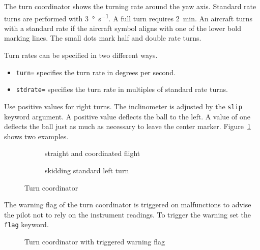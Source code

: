 The turn coordinator shows the turning rate around the yaw axis. Standard rate
turns are performed with \SI{3}{\degree\per\second}. A full turn requires
\SI{2}{\minute}. An aircraft turns with a standard rate if the aircraft symbol
aligns with one of the lower bold marking lines. The small dots mark half and
double rate turns.

Turn rates can be specified in two different ways.

\begin{itemize}
\item \texttt{turn=} specifies the turn rate in degrees per second.
\item \texttt{stdrate=} specifies the turn rate in multiples of standard rate turns.
\end{itemize}

Use positive values for right turns. The inclinometer is adjusted by the
\texttt{slip} keyword argument. A positive value deflects the ball to the left.
A value of one deflects the ball just as much as necessary to leave the center
marker. Figure~\ref{fig:inst:tc:base} shows two examples.

\begin{figure}[!h]
\begin{subfigure}{\linewidth}
\centering
{}
\caption{straight and coordinated flight}
\end{subfigure}

\medskip

\begin{subfigure}{\linewidth}
\centering
{}
\caption{skidding standard left turn}
\end{subfigure}

\caption{Turn coordinator}
\label{fig:inst:tc:base}
\end{figure}

The warning flag of the turn coordinator is triggered on malfunctions to advise
the pilot not to rely on the instrument readings. To trigger the warning set
the \texttt{flag} keyword.

\begin{figure}
\centering
{}
\caption{Turn coordinator with triggered warning flag}
\label{fig:inst:tc:flag}
\end{figure}
